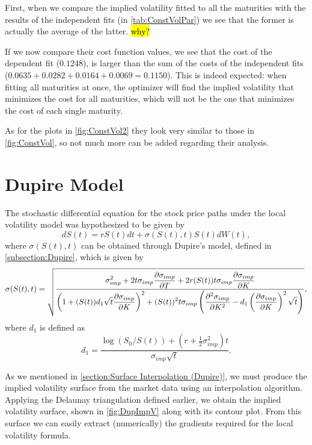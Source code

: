 First, when we compare the implied volatility fitted to all the maturities with the results of the independent fits (in \autoref{tab:ConstVolPar}) we see that the former is actually the average of the latter. \hl{why?}

If we now compare their cost function values, we see that the cost of the dependent fit ($0.1248$), is larger than the sum of the costs of the independent fits ($0.0635+0.0282+0.0164+0.0069=0.1150$). This is indeed expected: when fitting all maturities at once, the optimizer will find the implied volatility that minimizes the cost for all maturities, which will not be the one that minimizes the cost of each single maturity.

As for the plots in \autoref{fig:ConstVol2} they look very similar to those in \autoref{fig:ConstVol}, so not much more can be added regarding their analysis.





\newpage
\section{Dupire Model}
The stochastic differential equation for the stock price paths under the local volatility model was hypothesized to be given by
\begin{equation}\label{dupmodds}
dS(t)=rS(t)dt+\sigma(S(t),t)S(t)dW(t),
\end{equation}
\noindent where $\sigma(S(t),t)$ can be obtained through Dupire's model, defined in \autoref{subsection:Dupire}, which is given by
\begin{equation}\label{dupmodds2}
\sigma(S(t),t)=\sqrt{\frac{\displaystyle\sigma_{imp}^2+2t\sigma_{imp}\pdv{\sigma_{imp}}{T}+2r(S(t))t\sigma_{imp}\pdv{\sigma_{imp}}{K}}{\displaystyle\left(1+(S(t))d_1\sqrt{t}\pdv{\sigma_{imp}}{K}\right)^2+(S(t))^2t\sigma_{imp}\left(\pdv{^2\sigma_{imp}}{K^2}-d_1\left(\pdv{\sigma_{imp}}{K}\right)^2\sqrt{t}\right)}},
\end{equation}
\noindent where $d_1$ is defined as
\begin{equation}
d_1=\frac{\log(S_0/S(t))+\left(r+\frac{1}{2}\sigma_{imp}^2\right)t}{\sigma_{imp}\sqrt{t}}.
\end{equation}

As we mentioned in \autoref{section:Surface Interpolation (Dupire)}, we must produce the implied volatility surface from the market data using an interpolation algorithm. Applying the Delaunay triangulation defined earlier, we obtain the implied volatility surface, shown in \autoref{fig:DupImpV} along with its contour plot.
From this surface we can easily extract (numerically) the gradients required for the local volatility formula.



